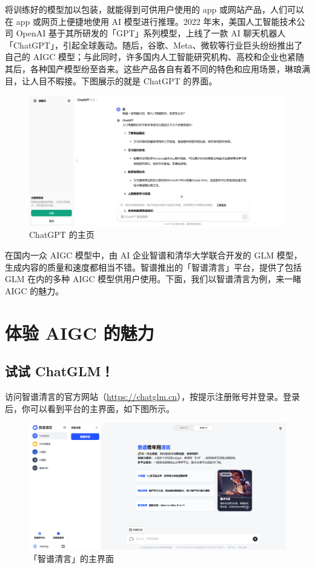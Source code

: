 将训练好的模型加以包装，就能得到可供用户使用的 app 或网站产品，人们可以在 app 或网页上便捷地使用 AI 模型进行推理。2022 年末，美国人工智能技术公司 OpenAI 基于其所研发的「GPT」系列模型，上线了一款 AI 聊天机器人「ChatGPT」，引起全球轰动。随后，谷歌、Meta、微软等行业巨头纷纷推出了自己的 AIGC 模型；与此同时，许多国内人工智能研究机构、高校和企业也紧随其后，各种国产模型纷至沓来。这些产品各自有着不同的特色和应用场景，琳琅满目，让人目不暇接。下图展示的就是 ChatGPT 的界面。

\begin{figure}[htb!]
  \centering
  \includegraphics[width=.9\textwidth]{assets/surpass/ChatGPT.png}
  \caption{ChatGPT 的主页}
  \label{fig:ChatGPT}
\end{figure}

在国内一众 AIGC 模型中，由 AI 企业智谱和清华大学联合开发的 GLM 模型，生成内容的质量和速度都相当不错。智谱推出的「智谱清言」平台，提供了包括 GLM 在内的多种 AIGC 模型供用户使用。下面，我们以智谱清言为例，来一睹 AIGC 的魅力。

\section{体验 AIGC 的魅力}

\subsection{试试 ChatGLM！}

访问智谱清言的官方网站（\url{https://chatglm.cn}），按提示注册账号并登录。登录后，你可以看到平台的主界面，如下图所示。

\begin{figure}[htb!]
  \centering
  \includegraphics[width=.9\textwidth]{assets/surpass/Zhipu_main.png}
  \caption{「智谱清言」的主界面}
  \label{fig:Zhipu_main}
\end{figure}

